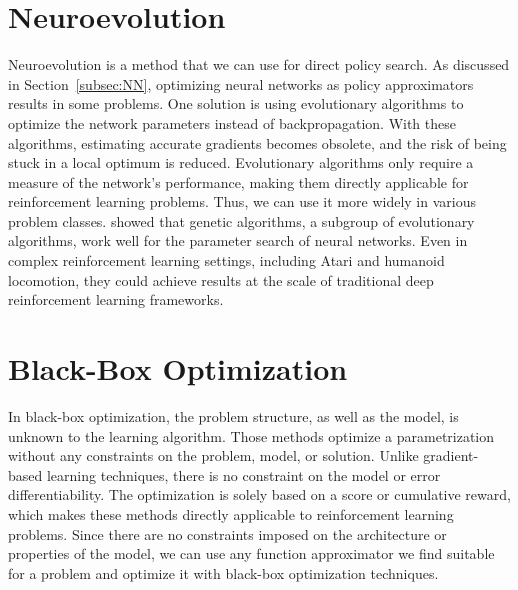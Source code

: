 \section{Neuroevolution}
\label{s:neuroevolution}
Neuroevolution is a method that we can use for direct policy search. As discussed in Section~\ref{subsec:NN}, optimizing neural networks as policy approximators results in some problems. One solution is using evolutionary algorithms to optimize the network parameters instead of backpropagation. With these algorithms, estimating accurate gradients becomes obsolete, and the risk of being stuck in a local optimum is reduced. Evolutionary algorithms only require a measure of the network's performance, making them directly applicable for reinforcement learning problems. Thus, we can use it more widely in various problem classes. \cite{such2017deep} showed that genetic algorithms, a subgroup of evolutionary algorithms, work well for the parameter search of neural networks. Even in complex reinforcement learning settings, including Atari and humanoid locomotion, they could achieve results at the scale of traditional deep reinforcement learning frameworks.


\section{Black-Box Optimization}
In black-box optimization, the problem structure, as well as the model, is unknown to the learning algorithm. Those methods optimize a parametrization without any constraints on the problem, model, or solution. Unlike gradient-based learning techniques, there is no constraint on the model or error differentiability. The optimization is solely based on a score or cumulative reward, which makes these methods directly applicable to reinforcement learning problems. Since there are no constraints imposed on the architecture or properties of the model, we can use any function approximator we find suitable for a problem and optimize it with black-box optimization techniques.

